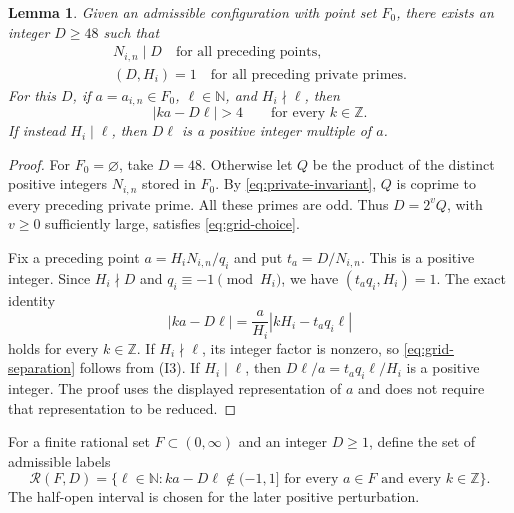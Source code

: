 \documentclass[11pt,reqno]{amsart}
\newtheorem{lemma}[theorem]{Lemma}
\theoremstyle{definition}
\theoremstyle{remark}
\numberwithin{equation}{section}
\newcommand{\N}{\mathbb N}
\newcommand{\Z}{\mathbb Z}
\newcommand{\cR}{\mathcal R}
\begin{document}
\begin{lemma}\label{lem:grid}
Given an admissible configuration with point set $F_0$, there exists an
integer $D\geq48$ such that
\begin{equation}\label{eq:grid-choice}
 \begin{gathered}
 N_{i,n}\mid D\quad\text{for all preceding points},\\
 (D,H_i)=1\quad\text{for all preceding private primes}.
 \end{gathered}
\end{equation}
For this $D$, if $a=a_{i,n}\in F_0$, $\ell\in\N$, and $H_i\nmid\ell$,
then
\begin{equation}\label{eq:grid-separation}
 |ka-D\ell|>4\qquad\text{for every }k\in\Z.
\end{equation}
If instead $H_i\mid\ell$, then $D\ell$ is a positive integer multiple
of $a$.
\end{lemma}

\begin{proof}
For $F_0=\varnothing$, take $D=48$. Otherwise let
$Q$ be the product of the distinct positive integers $N_{i,n}$ stored
in $F_0$. By
\eqref{eq:private-invariant}, $Q$ is coprime to every preceding private
prime. All these primes are odd. Thus $D=2^vQ$, with $v\geq0$ sufficiently
large, satisfies \eqref{eq:grid-choice}.

Fix a preceding point $a=H_iN_{i,n}/q_i$ and put $t_a=D/N_{i,n}$.
This is a positive integer. Since $H_i\nmid D$ and
$q_i\equiv-1\pmod {H_i}$, we have $(t_aq_i,H_i)=1$. The exact identity
\begin{equation}\label{eq:integer-gap}
 |ka-D\ell|=\frac a{H_i}|kH_i-t_aq_i\ell|
\end{equation}
holds for every $k\in\Z$. If $H_i\nmid\ell$, its integer factor is
nonzero, so \eqref{eq:grid-separation} follows from (I3). If
$H_i\mid\ell$, then $D\ell/a=t_aq_i\ell/H_i$ is a positive integer.
The proof uses the displayed representation of $a$ and does not require
that representation to be reduced.
\end{proof}

For a finite rational set $F\subset(0,\infty)$ and an integer $D\geq1$,
define the set of admissible labels
\begin{equation}\label{eq:free-labels}
 \cR(F,D)=\{\ell\in\N:ka-D\ell\notin(-1,1]
             \text{ for every }a\in F\text{ and every }k\in\Z\}.
\end{equation}
The half-open interval is chosen for the later positive perturbation.
\end{document}
